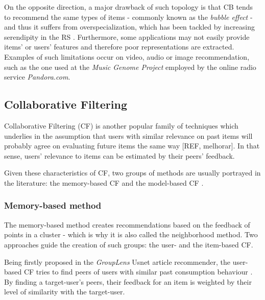     On the opposite direction, a major drawback of such topology is that CB tends to recommend the same types of items - commonly known as the \textit{bubble effect} - and thus it suffers from overspecialization, which has been tackled by increasing serendipity in the RS \cite{10.1109/HIS.2008.25}. Furthermore, some applications may not easily provide items' or users' features and therefore poor representations are extracted. Examples of such limitations occur on video, audio or image recommendation, such as the one used at the \textit{Music Genome Project} \cite{2009MFTechniques} employed by the online radio service \textit{Pandora.com}.

\subsection{Collaborative Filtering}
\label{sec:CF}

    Collaborative Filtering (CF)  is another popular family of techniques which underlies in the assumption     that users with similar relevance on past items will probably agree on evaluating future items the same way [REF, melhorar]. In that sense, users' relevance to items can be estimated by their peers' feedback.

    Given these characteristics of CF, two groups of methods are usually portrayed in the literature: the memory-based CF and the model-based CF \cite{2010Handbook}. 

  \subsubsection{Memory-based method}

    The memory-based method creates recommendations based on the feedback of points in a cluster - which is why it is also called the neighborhood method. Two approaches guide the creation of such groups: the user- and the item-based CF.
    
    
    Being firstly proposed in the \textit{GroupLens} Usnet article recommender, the user-based CF tries to find peers of users with similar past consumption behaviour \cite{10.1145/192844.192905}. By finding a target-user's peers, their feedback for an item is weighted by their level of similarity with the target-user.
    
